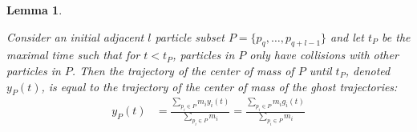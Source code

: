 \documentclass[11pt]{article}
\newtheorem{lemma}[theorem]{Lemma}
\numberwithin{equation}{section}
\begin{document}
        \begin{lemma}\label{PC1}
        
            Consider an initial adjacent $l$ particle subset $P = \{p_q,\ldots,p_{q+l-1}\}$ and let $t_P$ be the maximal time such that for $t<t_P$, particles in $P$ only have collisions with other particles in $P$. Then the trajectory of the center of mass of $P$ until $t_P$, denoted $y_P(t)$, is equal to the trajectory of the center of mass of the ghost trajectories:
        \begin{align*}\label{Y-P}
            y_P(t) &= \frac{\sum_{p_i\in P}m_iy_i(t)}{\sum_{p_i\in P}m_i} = \frac{\sum_{p_i\in P}m_ig_i(t)}{\sum_{p_i\in P}m_i}
            \end{align*}
        \end{lemma}
    
\end{document}
